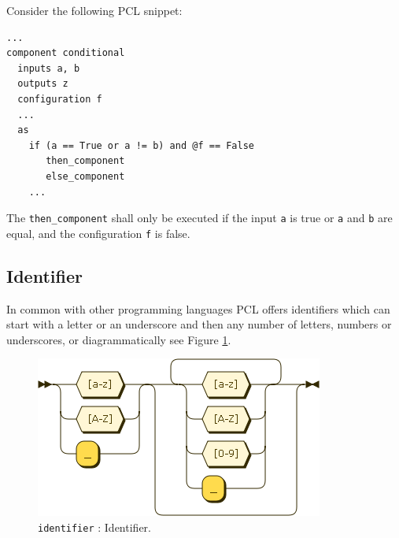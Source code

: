 Consider the following PCL snippet:
\begin{center}
  \begin{verbatim}
...
component conditional
  inputs a, b
  outputs z
  configuration f
  ...
  as
    if (a == True or a != b) and @f == False
       then_component
       else_component
    ...
  \end{verbatim}
\end{center}
The \texttt{then\_component} shall only be executed if the input \texttt{a} is true or \texttt{a} and \texttt{b} are equal, and the configuration \texttt{f} is false.

\subsection{Identifier}
In common with other programming languages PCL offers identifiers which can start with a letter or an underscore and then any number of letters, numbers or underscores, or diagrammatically see Figure \ref{fig:pcl-id}.
\begin{figure}[h!]
  \centering
    \includegraphics[scale=\DiagramScale]{chapters/compiler/diagrams/identifier}
  \caption{\texttt{identifier} : Identifier.}
  \label{fig:pcl-id}
\end{figure}

